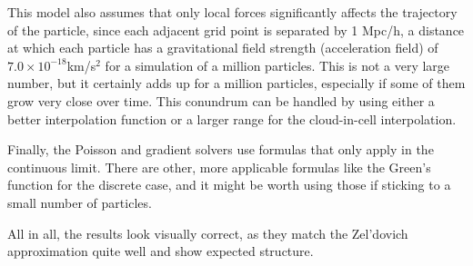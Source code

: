 \documentclass[12pt]{article}   	%
\begin{document}
This model also assumes that only local forces significantly affects the trajectory of the particle, since 
each adjacent grid point is separated by 1 Mpc/h, a distance at which each particle has a gravitational 
field strength (acceleration field) of $7.0\times 10^{-18}$km/s$^2$ for a simulation of a million particles. 
This is not a very large number, but it certainly adds up for a million particles, especially if some of them
grow very close over time. This conundrum can be handled by using either a better interpolation 
function or a larger range for the cloud-in-cell interpolation.

Finally, the Poisson and gradient solvers use formulas that only apply in the continuous limit. There
are other, more applicable formulas like the Green's function for the discrete case, and it might be
worth using those if sticking to a small number of particles.

All in all, the results look visually correct, as they match the Zel'dovich approximation quite well and
show expected structure.
\end{document}
